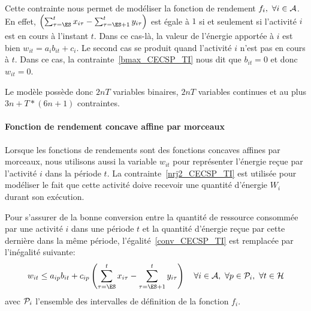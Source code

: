 Cette contrainte nous permet de modéliser la fonction de rendement
$f_i,\ \forall i \in \A$. En effet, $\left(\sum_{\tau=\ES}^t
x_{i\tau}-\sum_{\tau=\ES+1}^t y_{i\tau}\right) $ est égale à $1$ si et
seulement si l'activité $i$ est en cours à l'instant $t$.  Dans ce
cas-là, la valeur de l'énergie apportée à $i$ est bien
$w_{it}=a_ib_{it}+c_i$. Le second cas se produit quand l'activité $i$
n'est pas en cours à $t$. Dans ce cas, la
contrainte~\eqref{bmax_CECSP_TI} nous dit que $b_{it}=0$ et donc
$w_{it}=0$.

Le modèle possède donc $2nT$ variables binaires, $2nT$ variables
continues et au plus $3n+T*(6n+1)$ contraintes.

\paragraph{Fonction de rendement concave affine par morceaux}

Lorsque les fonctions de rendements sont des fonctions concaves
affines par morceaux, nous utilisons aussi la variable $w_{it}$ pour
représenter l'énergie reçue par l'activité $i$ dans la période $t$. La
contrainte~\eqref{nrj2_CECSP_TI} est utilisée pour modéliser le fait
que cette activité doive recevoir une quantité d'énergie $W_i$ durant
son exécution. 

Pour s'assurer de la bonne conversion entre la quantité de ressource
consommée par une activité $i$ dans une période $t$ et la quantité
d'énergie reçue par cette dernière dans la même période,
l'égalité~\eqref{conv_CECSP_TI} est remplacée par l'inégalité
suivante: 
\begin{equation}
w_{it} \le a_{ip}b_{it} + c_{ip}\left(\sum_{\tau=\ES}^t
x_{i\tau}-\sum_{\tau=\ES+1}^t y_{i\tau}\right) \quad  \forall i \in
\A,\ \forall p \in \P_i,\ \forall t \in \H 
\label{conv_CECSP_TI2}
\end{equation}
avec $\P_i$ l'ensemble des intervalles de définition de la fonction
$f_i$.

